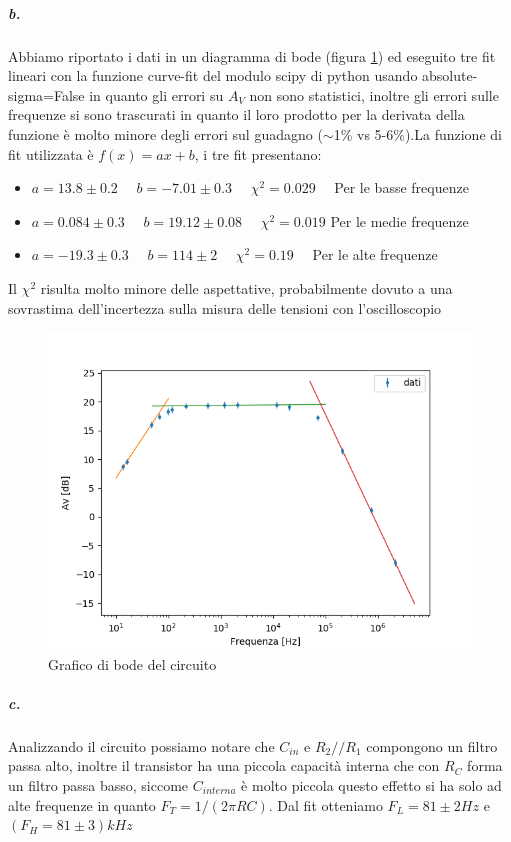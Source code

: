 \documentclass[10pt,a4paper]{article}
\begin{document}
\subparagraph{b.}
Abbiamo riportato i dati in un diagramma di bode (figura \ref{fig:fit}) ed eseguito tre fit lineari con la funzione curve-fit del modulo scipy di python usando absolute-sigma=False in quanto gli errori su $A_V$ non sono statistici, inoltre gli errori sulle frequenze si sono trascurati in quanto il loro prodotto per la derivata della funzione è molto minore degli errori sul guadagno ($\sim$1\% vs 5-6\%).\newline La funzione di fit utilizzata è $f(x)=ax+b$, i tre fit presentano: 
\begin{itemize}
\item $a=13.8\pm0.2\quad$ $b=-7.01\pm0.3\quad$ $\chi^2=0.029\quad$ Per le basse frequenze
\item $a=0.084\pm0.3\quad$ $b=19.12\pm0.08\quad$ $\chi^2=0.019$ Per le medie frequenze
\item $a=-19.3\pm0.3\quad$ $b=114\pm2\quad$ $\chi^2=0.19\quad$ Per le alte frequenze
\end{itemize}

Il $\chi^2$ risulta molto minore delle aspettative, probabilmente dovuto a una sovrastima dell'incertezza sulla misura delle tensioni con l'oscilloscopio

\begin{figure}
	\centering
    \includegraphics[scale=0.8]{fit.png} 
    \caption{Grafico di bode del circuito}
    \label{fig:fit}
\end{figure}
    
\subparagraph{c.}
Analizzando il circuito possiamo notare che $C_{in}$ e $R_2//R_1$ compongono un filtro passa alto, inoltre il transistor ha una piccola capacità interna che con $R_C$ forma un filtro passa basso, siccome $C_{interna}$ è molto piccola questo effetto si ha solo ad alte frequenze in quanto $F_T=1/(2\pi RC)$. Dal fit otteniamo $F_L=81\pm2 Hz$ e $(F_H=81\pm3) k Hz$
		
\end{document}
